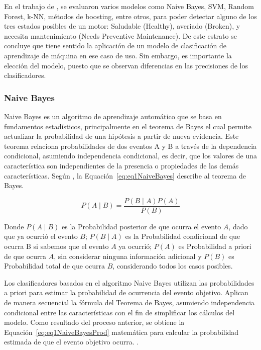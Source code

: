 \documentclass[11pt,a4paper,spanish]{book}
\numberwithin{equation}{chapter}
\numberwithin{figure}{chapter}
\begin{document}
En el trabajo de \cite{baradaran2025predictivemaintenanceelectricmotors}, se  evaluaron 
varios modelos como Naive Bayes, SVM, Random Forest, k-NN, métodos de boosting, entre 
otros, para poder detectar alguno de los tres estados posibles de un motor: Saludable 
(Healthy), averiado (Broken), y necesita mantenimiento (Needs Preventive Maintenance).
De este estrato se concluye que tiene sentido la aplicación de un modelo de clasificación
de aprendizaje de máquina en ese caso de uso. Sin embargo, es importante la elección del
modelo, puesto que se observan diferencias en las precisiones de los clasificadores.   


\subsubsection{Naive Bayes}

Naive Bayes es un algoritmo de aprendizaje automático que se basa en fundamentos 
estadísticos, principalmente en el teorema de Bayes el cual permite actualizar la 
probabilidad de una hipótesis a partir de nueva evidencia. Este teorema relaciona 
probabilidades de dos eventos A y B a través de la dependencia condicional, asumiendo 
independencia condicional, es decir, que los valores de una característica son 
independientes de la presencia o propiedades de las demás características. Según 
\cite{han2012datamining}, la Equación~\ref{eq:eq1NaiveBayes} describe al teorema de 
Bayes.


\begin{equation}\label{eq:eq1NaiveBayes}
P(A \mid B) = \frac{P(B \mid A) P(A)}{P(B)}
\end{equation}


Donde $P(A \mid B)$ es la Probabilidad posterior de que ocurra el evento $A$, dado que 
ya ocurrió el evento $B$; $P(B \mid A)$ es la Probabilidad condicional de que ocurra B 
si sabemos que el evento $A$ ya ocurrió; $P(A)$ es Probabilidad a priori de que ocurra 
$A$, sin considerar ninguna información adicional y $P(B)$ es Probabilidad total de que 
ocurra $B$, considerando todos los casos posibles.


Los clasificadores basados en el algoritmo Naive Bayes utilizan las probabilidades a 
priori para estimar la probabilidad de ocurrencia del evento objetivo. Aplican de 
manera secuencial la fórmula del Teorema de Bayes, asumiendo independencia condicional 
entre las características con el fin de simplificar los cálculos del modelo. 
Como resultado del proceso anterior, se obtiene la Equación~\ref{eq:eq1NaiveBayesProd} 
matemática para calcular la probabilidad estimada de que el evento objetivo ocurra. 
\cite{salman2024rf}. 
\end{document}
